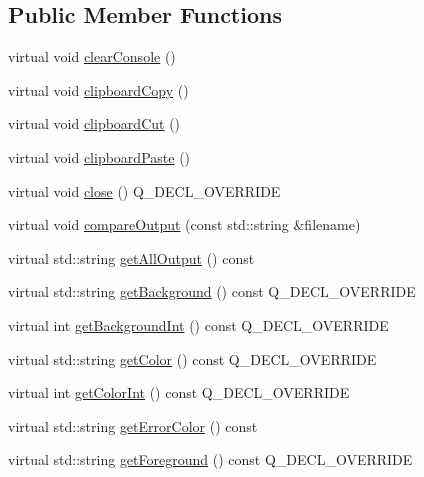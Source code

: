 \subsection*{Public Member Functions}
\begin{DoxyCompactItemize}
\item 
virtual void \mbox{\hyperlink{classGConsoleWindow_aff6c831918692405e75fc55c43424304}{clear\+Console}} ()
\item 
virtual void \mbox{\hyperlink{classGConsoleWindow_a1dfc643da74c9726f39d6ca1cc50695b}{clipboard\+Copy}} ()
\item 
virtual void \mbox{\hyperlink{classGConsoleWindow_a63b6f62f675f6006452b508833c9b5bb}{clipboard\+Cut}} ()
\item 
virtual void \mbox{\hyperlink{classGConsoleWindow_aaf8797729559a77156336ffbe8c78034}{clipboard\+Paste}} ()
\item 
virtual void \mbox{\hyperlink{classGConsoleWindow_a8dcbf96983142003634316797e355b1d}{close}} () Q\+\_\+\+D\+E\+C\+L\+\_\+\+O\+V\+E\+R\+R\+I\+DE
\item 
virtual void \mbox{\hyperlink{classGConsoleWindow_a7fa1a8b3ecd3a06825607a8126374476}{compare\+Output}} (const std\+::string \&filename)
\item 
virtual std\+::string \mbox{\hyperlink{classGConsoleWindow_adb92e6f5b1224f5a4910bf32f916b33a}{get\+All\+Output}} () const
\item 
virtual std\+::string \mbox{\hyperlink{classGConsoleWindow_ab44f928b6bd7c8e4b82d5ed92bc3d4c6}{get\+Background}} () const Q\+\_\+\+D\+E\+C\+L\+\_\+\+O\+V\+E\+R\+R\+I\+DE
\item 
virtual int \mbox{\hyperlink{classGConsoleWindow_af66f525e8154dbc8dcd2daecf3728ba9}{get\+Background\+Int}} () const Q\+\_\+\+D\+E\+C\+L\+\_\+\+O\+V\+E\+R\+R\+I\+DE
\item 
virtual std\+::string \mbox{\hyperlink{classGConsoleWindow_a84190923e423247f718a3d9d96a74642}{get\+Color}} () const Q\+\_\+\+D\+E\+C\+L\+\_\+\+O\+V\+E\+R\+R\+I\+DE
\item 
virtual int \mbox{\hyperlink{classGConsoleWindow_a3d883dbfb3fbb39dbe8af0f2ed66ff16}{get\+Color\+Int}} () const Q\+\_\+\+D\+E\+C\+L\+\_\+\+O\+V\+E\+R\+R\+I\+DE
\item 
virtual std\+::string \mbox{\hyperlink{classGConsoleWindow_afe1960475560f9194a178adc31b8a798}{get\+Error\+Color}} () const
\item 
virtual std\+::string \mbox{\hyperlink{classGConsoleWindow_a2ffdbce6185726181fe0f26b691d25f5}{get\+Foreground}} () const Q\+\_\+\+D\+E\+C\+L\+\_\+\+O\+V\+E\+R\+R\+I\+DE

\end{DoxyCompactItemize}
